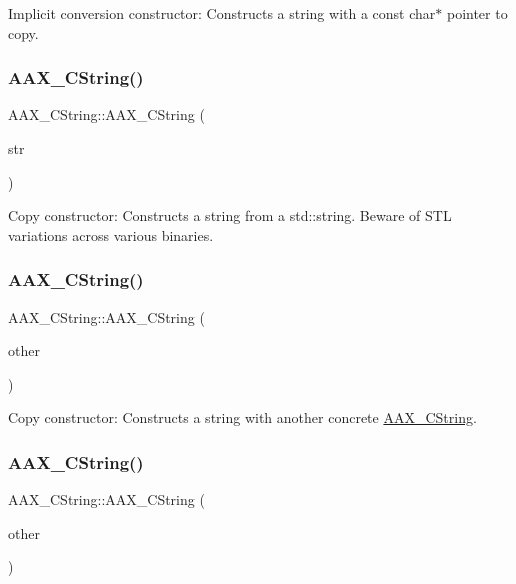 Implicit conversion constructor\+: Constructs a string with a const char$\ast$ pointer to copy. \mbox{\label{a01573_a048cec8f3bb8c1c1173f134232c01bf9}} 
\subsubsection{\texorpdfstring{AAX\_CString()}{AAX\_CString()}\hspace{0.1cm}{\footnotesize\ttfamily [3/5]}}
{\footnotesize\ttfamily A\+A\+X\+\_\+\+C\+String\+::\+A\+A\+X\+\_\+\+C\+String (\begin{DoxyParamCaption}\item[{const std\+::string \&}]{str }\end{DoxyParamCaption})\hspace{0.3cm}{\ttfamily [explicit]}}

Copy constructor\+: Constructs a string from a std\+::string. Beware of S\+TL variations across various binaries. \mbox{\label{a01573_a5d27338ab3b3175c1e0e7e13bf6dab03}} 
\subsubsection{\texorpdfstring{AAX\_CString()}{AAX\_CString()}\hspace{0.1cm}{\footnotesize\ttfamily [4/5]}}
{\footnotesize\ttfamily A\+A\+X\+\_\+\+C\+String\+::\+A\+A\+X\+\_\+\+C\+String (\begin{DoxyParamCaption}\item[{const \mbox{\hyperlink{a01573}{A\+A\+X\+\_\+\+C\+String}} \&}]{other }\end{DoxyParamCaption})}

Copy constructor\+: Constructs a string with another concrete \mbox{\hyperlink{a01573}{A\+A\+X\+\_\+\+C\+String}}. \mbox{\label{a01573_a46d28b14a31fca79480d2f4ce9446939}} 
\subsubsection{\texorpdfstring{AAX\_CString()}{AAX\_CString()}\hspace{0.1cm}{\footnotesize\ttfamily [5/5]}}
{\footnotesize\ttfamily A\+A\+X\+\_\+\+C\+String\+::\+A\+A\+X\+\_\+\+C\+String (\begin{DoxyParamCaption}\item[{const \mbox{\hyperlink{a01873}{A\+A\+X\+\_\+\+I\+String}} \&}]{other }\end{DoxyParamCaption})}


